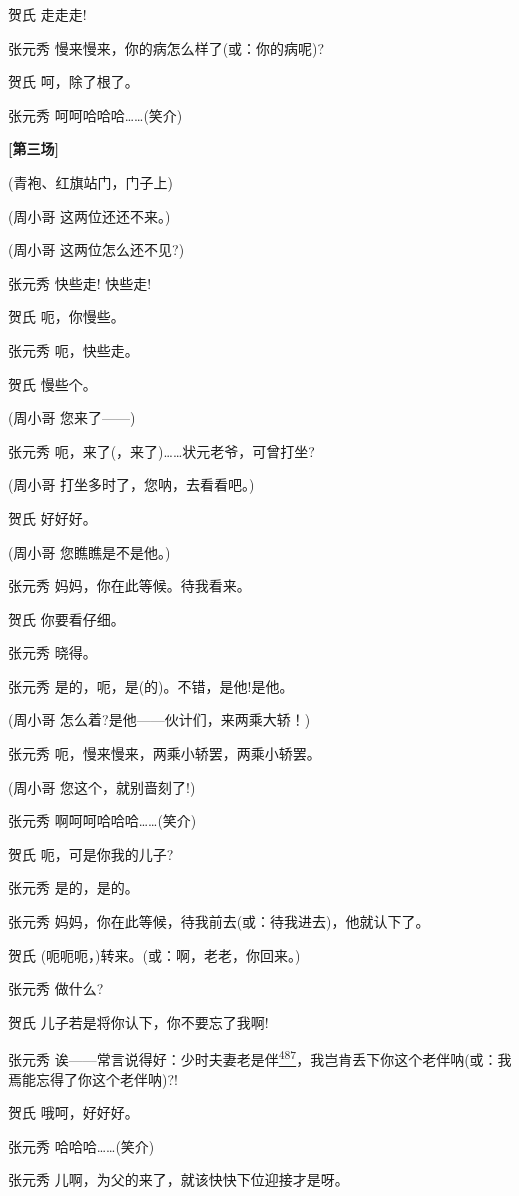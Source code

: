 贺氏 走走走!

张元秀 慢来慢来，你的病怎么样了(或：你的病呢)?

贺氏 呵，除了根了。

张元秀 呵呵哈哈哈\ldots{}\ldots{}(笑介)

\textbf{{[}第三场{]}}

(青袍、红旗站门，门子上)

(周小哥 这两位还还不来。)

(周小哥 这两位怎么还不见?)

张元秀 快些走! 快些走!

贺氏 呃，你慢些。

张元秀 呃，快些走。

贺氏 慢些个。

(周小哥 您来了------)

张元秀 呃，来了(，来了)\ldots{}\ldots{}状元老爷，可曾打坐?

(周小哥 打坐多时了，您呐，去看看吧。)

贺氏 好好好。

(周小哥 您瞧瞧是不是他。)

张元秀 妈妈，你在此等候。待我看来。

贺氏 你要看仔细。

张元秀 晓得。

张元秀 是的，呃，是(的)。不错，是他!是他。

(周小哥 怎么着?是他------伙计们，来两乘大轿！)

张元秀 呃，慢来慢来，两乘小轿罢，两乘小轿罢。

(周小哥 您这个，就别啬刻了!)

张元秀 啊呵呵哈哈哈\ldots{}\ldots{}(笑介)

贺氏 呃，可是你我的儿子?

张元秀 是的，是的。

张元秀 妈妈，你在此等候，待我前去(或：待我进去)，他就认下了。

贺氏 (呃呃呃，)转来。(或：啊，老老，你回来。)

张元秀 做什么?

贺氏 儿子若是将你认下，你不要忘了我啊!

张元秀
诶------常言说得好：少时夫妻老是伴\protect\hyperlink{fn487}{\textsuperscript{487}}，我岂肯丢下你这个老伴呐(或：我焉能忘得了你这个老伴呐)?!

贺氏 哦呵，好好好。

张元秀 哈哈哈\ldots{}\ldots{}(笑介)

张元秀 儿啊，为父的来了，就该快快下位迎接才是呀。

